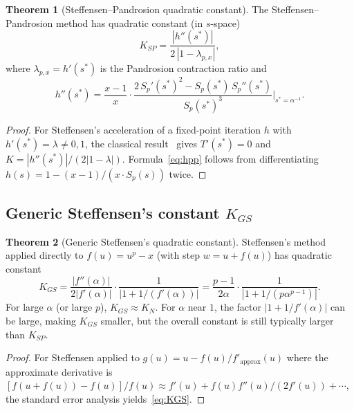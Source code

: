 \documentclass[11pt,a4paper]{article}
\theoremstyle{definition}
\newtheorem{theorem}{Theorem}[section]
\begin{document}
\begin{theorem}[Steffensen--Pandrosion quadratic constant]
\label{thm:KSP}
The Steffensen--Pandrosion method has quadratic constant (in $s$-space)
\begin{equation}
  \label{eq:KSP}
  K_{SP} = \frac{|h''(s^*)|}{2\,|1 - \lambda_{p,x}|},
\end{equation}
where $\lambda_{p,x} = h'(s^*)$ is the Pandrosion contraction ratio and
\begin{equation}
  \label{eq:hpp}
  h''(s^*) = \frac{x-1}{x} \cdot \frac{2\,S_p'(s^*)^2 - S_p(s^*)\,S_p''(s^*)}{S_p(s^*)^3}\bigg|_{s^* = \alpha^{-1}}.
\end{equation}
\end{theorem}

\begin{proof}
For Steffensen's acceleration of a fixed-point iteration $h$ with $h'(s^*) = \lambda \neq 0,1$, the classical result~\cite{stoer} gives $T'(s^*) = 0$ and $K = |h''(s^*)|/(2|1-\lambda|)$.  Formula~\eqref{eq:hpp} follows from differentiating $h(s) = 1 - (x-1)/(x \cdot S_p(s))$ twice.
\end{proof}

\subsection{Generic Steffensen's constant \texorpdfstring{$K_{GS}$}{K\_GS}}

\begin{theorem}[Generic Steffensen's quadratic constant]
\label{thm:KGS}
Steffensen's method applied directly to $f(u) = u^p - x$ (with step $w = u + f(u)$) has quadratic constant
\begin{equation}
  \label{eq:KGS}
  K_{GS} = \frac{|f''(\alpha)|}{2|f'(\alpha)|} \cdot \frac{1}{|1 + 1/(f'(\alpha))|}
  = \frac{p-1}{2\alpha} \cdot \frac{1}{|1 + 1/(p\alpha^{p-1})|}.
\end{equation}
For large $\alpha$ (or large $p$), $K_{GS} \approx K_N$.  For $\alpha$ near $1$, the factor $|1 + 1/f'(\alpha)|$ can be large, making $K_{GS}$ smaller, but the overall constant is still typically larger than $K_{SP}$.
\end{theorem}

\begin{proof}
For Steffensen applied to $g(u) = u - f(u)/f'_{\text{approx}}(u)$ where the approximate derivative is $[f(u+f(u)) - f(u)]/f(u) \approx f'(u) + f(u)f''(u)/(2f'(u)) + \cdots$, the standard error analysis yields~\eqref{eq:KGS}.
\end{proof}
\end{document}

